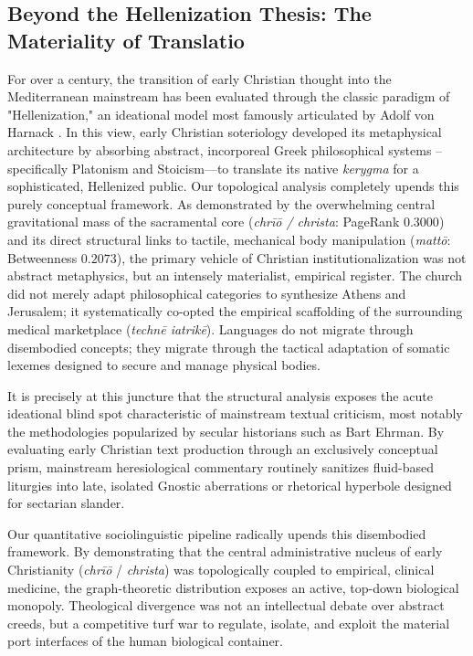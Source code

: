 \documentclass[11pt,twoside,a4paper]{article}
\begin{document}
\subsection{Beyond the Hellenization Thesis: The Materiality of Translatio}
For over a century, the transition of early Christian thought into the Mediterranean mainstream has been evaluated through the classic paradigm of "Hellenization," an ideational model most famously articulated by Adolf von Harnack \cite{harnack1909dogma}. In this view, early Christian soteriology developed its metaphysical architecture by absorbing abstract, incorporeal Greek philosophical systems -- specifically Platonism and Stoicism—to translate its native \textit{kerygma} for a sophisticated, Hellenized public.
Our topological analysis completely upends this purely conceptual framework. As demonstrated by the overwhelming central gravitational mass of the sacramental core (\textit{chrīō / christa}: PageRank $0.3000$) and its direct structural links to tactile, mechanical body manipulation (\textit{mattō}: Betweenness $0.2073$), the primary vehicle of Christian institutionalization was not abstract metaphysics, but an intensely materialist, empirical register. The church did not merely adapt philosophical categories to synthesize Athens and Jerusalem; it systematically co-opted the empirical scaffolding of the surrounding medical marketplace (\textit{technē iatrikē}). Languages do not migrate through disembodied concepts; they migrate through the tactical adaptation of somatic lexemes designed to secure and manage physical bodies.

It is precisely at this juncture that the structural analysis exposes the acute 
ideational blind spot characteristic of mainstream textual criticism, most notably 
the methodologies popularized by secular historians such as Bart Ehrman. By evaluating 
early Christian text production through an exclusively conceptual prism, mainstream 
heresiological commentary routinely sanitizes fluid-based liturgies into late, isolated 
Gnostic aberrations or rhetorical hyperbole designed for sectarian slander. 

Our quantitative sociolinguistic pipeline radically upends this disembodied framework. 
By demonstrating that the central administrative nucleus of early Christianity (\textit{chrīō} 
/ \textit{christa}) was topologically coupled to empirical, clinical medicine, the graph-theoretic 
distribution exposes an active, top-down biological monopoly. Theological divergence was not 
an intellectual debate over abstract creeds, but a competitive turf war to regulate, isolate, 
and exploit the material port interfaces of the human biological container.
\end{document}
